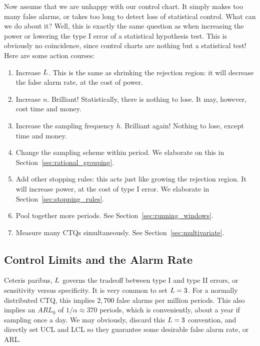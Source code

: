 Now assume that we are unhappy with our control chart. 
It simply makes too many false alarms, or takes too long to detect loss of statistical control.
What can we do about it?
Well, this is exactly the same question as when increasing the power or lowering the type I error of a statistical hypothesis test. This is obviously no coincidence, since control charts are nothing but a statistical test!
Here are some action courses:
\begin{enumerate}
\item Increase $L$. This is the same as shrinking the rejection region: 
it will decrease the false alarm rate, at the cost of power.
\item Increase $n$. Brilliant! Statistically, there is nothing to lose. It may, however, cost time and money.
\item Increase the sampling frequency $h$. Brilliant again! Nothing to lose, except time and money.
\item Change the sampling scheme within period. We elaborate on this in Section~\ref{sec:rational_grouping}.
\item Add other stopping rules: 
this acts just like growing the rejection region. It will increase power, at the cost of type I error. 
We elaborate in Section~\ref{sec:stopping_rules}.
\item Pool together more periods. See Section~\ref{sec:running_windows}.
\item Measure many CTQs simultaneously. See Section~\ref{sec:multivariate}. 
\end{enumerate}






\subsection{Control Limits and the Alarm Rate}
Ceteris paribus, $L$ governs the tradeoff between type I and type II errors, or sensitivity versus specificity.
It is very common to set $L=3$. 
For a normally distributed CTQ, this implies $2,700$ false alarms per million periods. 
This also implies an $ARL_0$ of $1/\alpha \approx 370$ periods, which is conveniently, about a year if sampling once a day.
We may obviously, discard this $L=3$ convention, and directly set UCL and LCL so they guarantee some desirable false alarm rate, or ARL.

